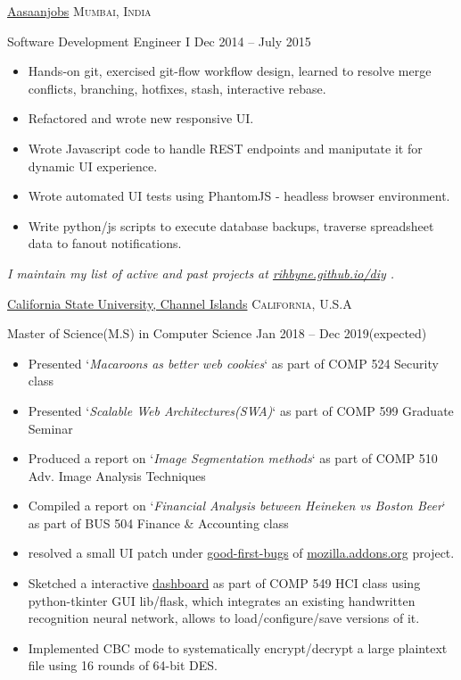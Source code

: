 \documentclass[10pt,a4paper]{article}
\begin{document}
\headedsection
    {\href{https://www.aasaanjobs.com/}{Aasaanjobs}}
    {\textsc{Mumbai, India}}
    {%
      \headedsubsection
      {Software Development Engineer I}
      {Dec 2014 -- July 2015}
      {
        \begin{itemize}
          \item Hands-on git, exercised git-flow workflow design, learned to resolve merge conflicts, branching, hotfixes, stash, interactive rebase.
          \item Refactored and wrote new responsive UI.
          \item Wrote Javascript code to handle REST endpoints and maniputate it for dynamic UI experience.
          \item Wrote automated UI tests using PhantomJS - headless browser environment.
          \item Write python/js scripts to execute database backups, traverse spreadsheet data to fanout notifications.
        \end{itemize}
      }
    }

\vspace{-0.2em}
\begin{center}
  \emph{\small I maintain my list of active and past projects at \href{http://rihbyne.github.io/diy}{rihbyne.github.io/diy} .}
\end{center}


\spacedhrule{-0.2em}{-0.4em}


\headedsection
  {\href{https://www.csuci.edu/}{California State University, Channel Islands}}
  {\textsc{California, U.S.A}} {%
  \headedsubsection
    {Master of Science(M.S) in Computer Science}
    {Jan 2018 -- Dec 2019(expected)}
    {
      \begin{itemize}
        \item Presented `\textit{Macaroons as better web cookies}` as part of COMP 524 Security class
        \item Presented `\textit{Scalable Web Architectures(SWA)}` as part of COMP 599 Graduate Seminar
        \item Produced a report on `\textit{Image Segmentation methods}` as part of COMP 510 Adv. Image Analysis Techniques
        \item Compiled a report on `\textit{Financial Analysis between Heineken vs Boston Beer}` as part of BUS 504 Finance \& Accounting class
        \item resolved a small UI patch under \href{https://wiki.mozilla.org/Add-ons/Contribute/Recognition\#August_2018}{good-first-bugs} of \href{https://addons.mozilla.org/en-US/firefox/}{mozilla.addons.org} project.
        \item Sketched a interactive \href{https://github.com/rihbyne/watch-ml-behave}{dashboard} as part of COMP 549 HCI class using python-tkinter GUI lib/flask, which integrates an existing handwritten recognition neural network, allows to load/configure/save versions of it. 
        \item Implemented CBC mode to systematically encrypt/decrypt a large plaintext file using 16 rounds of 64-bit DES.
      \end{itemize}
    }
  }
\end{document}
